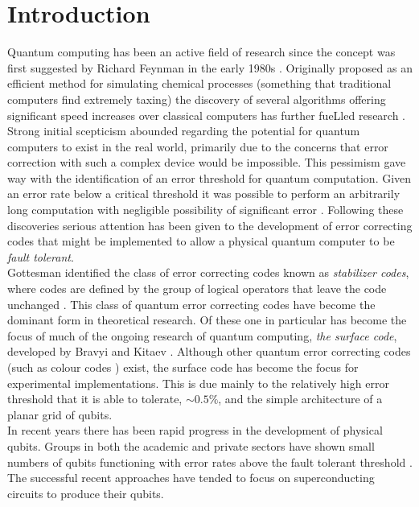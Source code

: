 
\chapter{Introduction}

Quantum computing has been an active field of research since the concept was first suggested by Richard Feynman in the early 1980s \cite{Feynman1982}.
Originally proposed as an efficient method for simulating chemical processes (something that traditional computers find extremely taxing) the discovery of several algorithms offering significant speed increases over classical computers has further fueLled research \cite{Shor1994,Shor1997}.
Strong initial scepticism abounded regarding the potential for quantum computers to exist in the real world, primarily due to the concerns that error correction with such a complex device would be impossible\cite{Preskill1997}.
This pessimism gave way with the identification of an error threshold for quantum computation.
Given an error rate below a critical threshold it was possible to perform an arbitrarily long computation with negligible possibility of significant error \cite{Shor1996,Aharonov1997}.
Following these discoveries serious attention has been given to the development of error correcting codes that might be implemented to allow a physical quantum computer to be \emph{fault tolerant}.
\\
Gottesman identified the class of error correcting codes known as \emph{stabilizer codes}, where codes are defined by the group of logical operators that leave the code unchanged \cite{Gottesman1997a}.
This class of quantum error correcting codes have become the dominant form in theoretical research.
Of these one in particular has become the focus of much of the ongoing research of quantum computing, \emph{the surface code}, developed by Bravyi and Kitaev \cite{Bravyi1998}.
Although other quantum error correcting codes (such as colour codes \cite{Vasmer2018}) exist, the surface code has become the focus for experimental implementations. This is due mainly to the relatively high error threshold that it is able to tolerate, $\sim0.5\%$, and the simple architecture of a planar grid of qubits.
\\
In recent years there has been rapid progress in the development of physical qubits.
Groups in both the academic and private sectors have shown small numbers of qubits functioning with error rates above the fault tolerant threshold \cite{Barends2015,Reagor2017}.
The successful recent approaches have tended to focus on superconducting circuits to produce their qubits.
